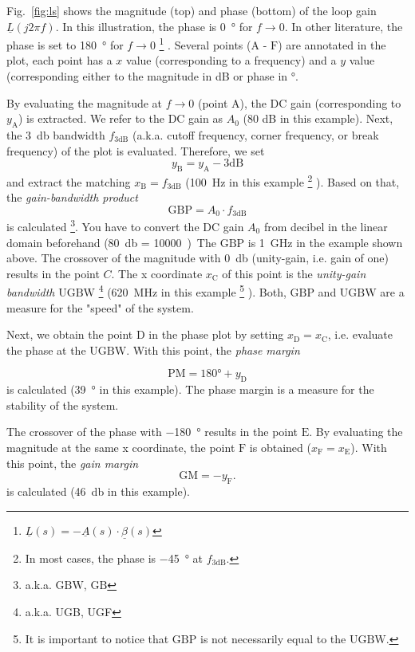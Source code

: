 \documentclass{article}[11pt]
\begin{document}
Fig.~\ref{fig:ls} shows the magnitude (top) and phase (bottom) of the 
loop gain $\underline{L}(j 2 \pi f)$.
In this illustration, the phase is \SI{0}{\degree} for $f \rightarrow 0$.
In other literature, the phase is set to \SI{180}{\degree} for 
$f \rightarrow 0$%
\footnote{$\underline{L}(s) = -\underline{A}(s) \cdot \underline{\beta}(s)$}
.
Several points ($\mathrm{A}$ - $\mathrm{F}$) are annotated in the plot, each 
point has a $x$ value (corresponding to a frequency) and a $y$ value 
(corresponding either to the magnitude in dB or phase in \si{\degree}.

\medskip

By evaluating the magnitude at $f \rightarrow 0$ (point $\mathrm{A}$), the
DC gain (corresponding to $y_{\mathrm{A}}$) is extracted.
We refer to the DC gain as $A_0$ (80 dB in this example).
Next, the \SI{3}{\decibel} bandwidth $f_{\mathrm{3dB}}$ 
(a.k.a. cutoff frequency, corner frequency, or break frequency) of the
plot is evaluated. 
Therefore, we set
$$
y_{\mathrm{B}} = y_{\mathrm{A}} - 3 \mathrm{dB}
$$
and extract the matching $x_{\mathrm{B}} = f_{\mathrm{3dB}}$ 
(\SI{100}{\hertz} in this example%
\footnote{In most cases, the phase is \SI{-45}{\degree} at
$f_{\mathrm{3dB}}$.}
).
Based on that, the \textit{gain-bandwidth product}
\begin{equation}
\mathrm{GBP} = A_0 \cdot f_{\mathrm{3dB}}
\end{equation}
is calculated%
\footnote{a.k.a. $\mathrm{GBW}$, $\mathrm{GB}$}. 
You have to convert the DC gain $A_0$ from decibel in the linear domain 
beforehand (\SI{80}{\decibel} = \qty{10000}).
The $\mathrm{GBP}$ is \SI{1}{\giga\hertz} in the example shown above.
The crossover of the magnitude with \SI{0}{\decibel} 
(unity-gain, i.e. gain of one) results in the point $C$.
The x coordinate $x_{\mathrm{C}}$ of this point is the 
\textit{unity-gain bandwidth}
$\mathrm{UGBW}$%
\footnote{a.k.a. UGB, UGF}
(\SI{620}{\mega\hertz} in this example%
\footnote{It is important to notice that $\mathrm{GBP}$ is not necessarily
equal to the $\mathrm{UGBW}$.}
).
Both, $\mathrm{GBP}$ and $\mathrm{UGBW}$ are a measure for the "speed" of
the system.

\medskip

Next, we obtain the point $\mathrm{D}$ in the phase plot by setting 
$x_{\mathrm{D}} = x_{\mathrm{C}}$, i.e. evaluate the phase at the 
$\mathrm{UGBW}$.
With this point, the \textit{phase margin}

$$
\mathrm{PM} = 180° + y_{\mathrm{D}}
$$
is calculated (\SI{39}{\degree} in this example).
The phase margin is a measure for the stability of the system.

The crossover of the phase with \SI{-180}{\degree} results in the 
point $\mathrm{E}$.
By evaluating the magnitude at the same x coordinate, the point 
$\mathrm{F}$ is obtained ($x_{\mathrm{F}} = x_{\mathrm{E}}$).
With this point, the \textit{gain margin}
$$
\mathrm{GM} = - y_{\mathrm{F}}.
$$
is calculated (\SI{46}{\decibel} in this example).

\printbibliography
\end{document}
